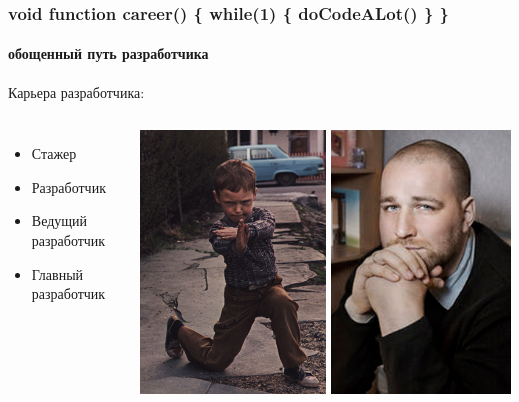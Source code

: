 \documentclass[10pt,pdf,hyperref={unicode}]{beamer}
\begin{document}
\begin{frame}
\frametitle{void function career() \{ while(1) \{ doCodeALot() \} \} }
\framesubtitle{ обощенный путь разработчика }

Карьера разработчика:

\begin{columns}

		\begin{itemize}
			\item Стажер
			\item Разработчик
			\item Ведущий разработчик
			\item Главный разработчик
		\end{itemize}


		\includegraphics[width=0.5\textwidth]{./intern.png}
		\includegraphics[width=0.484\textwidth]{./senior.png}

\end{columns}

\end{frame}
\end{document}
